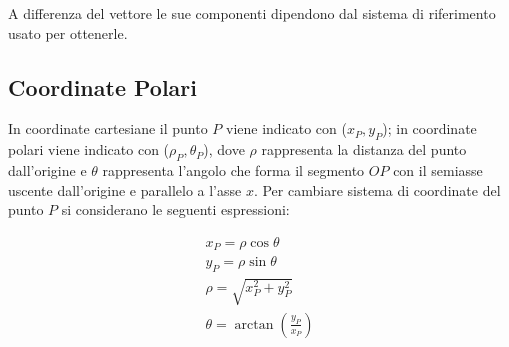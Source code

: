 \documentclass{article}
\numberwithin{equation}{subsection}
\begin{document}
A differenza del vettore le sue componenti dipendono dal sistema di riferimento usato per ottenerle.

\subsection{Coordinate Polari}
In coordinate cartesiane il punto $P$ viene indicato con ($x_P, y_P$); in coordinate polari viene indicato con ($\rho_P, \theta_P$), dove 
$\rho$ rappresenta la distanza del punto dall'origine e $\theta$ rappresenta l'angolo che forma il segmento $OP$ con il semiasse uscente dall'origine e parallelo a l'asse $x$.
Per cambiare sistema di coordinate del punto $P$ si considerano le seguenti espressioni:  

\begin{gather*}
    x_P = \rho \cos\theta\\
    y_P = \rho \sin\theta\\
    \rho = \displaystyle\sqrt{x_P^{2} + y_P^{2}}\\
    \theta = \arctan\left(\displaystyle\frac{y_P}{x_P}\right)
\end{gather*}
\end{document}
